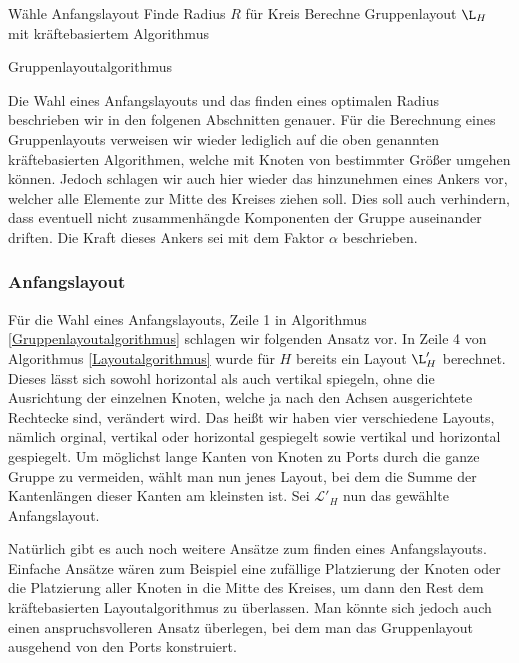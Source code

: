 \begin{algorithm}[H]
\label{Gruppenlayoutalgorithmus}
\SetAlgoLined
{} 
Wähle Anfangslayout\;
Finde Radius $R$ für Kreis\;
Berechne Gruppenlayout  $\L_H$ mit kräftebasiertem Algorithmus\;
\caption{Gruppenlayoutalgorithmus}
\end{algorithm}



Die Wahl eines Anfangslayouts und das finden eines optimalen Radius beschrieben wir  in den folgenen Abschnitten  genauer. 
Für die Berechnung eines Gruppenlayouts verweisen wir wieder lediglich auf die oben genannten kräftebasierten Algorithmen, welche mit Knoten von bestimmter Größer umgehen können. 
Jedoch schlagen wir auch hier wieder das hinzunehmen eines Ankers vor, welcher alle Elemente zur Mitte des Kreises ziehen soll. Dies soll auch verhindern, dass eventuell nicht zusammenhängde Komponenten der Gruppe auseinander driften. Die Kraft dieses Ankers sei mit dem Faktor $\alpha$ beschrieben. 

\subsubsection{Anfangslayout}
Für die Wahl eines Anfangslayouts, Zeile 1 in Algorithmus \ref{Gruppenlayoutalgorithmus} schlagen wir folgenden Ansatz vor.
In Zeile 4 von Algorithmus \ref{Layoutalgorithmus} wurde für $H$ bereits ein Layout $\L'_H$ berechnet. Dieses lässt sich sowohl horizontal als auch vertikal spiegeln, ohne die Ausrichtung der einzelnen Knoten, welche ja nach den Achsen ausgerichtete Rechtecke sind, verändert wird. Das heißt wir haben vier verschiedene Layouts, nämlich orginal, vertikal oder horizontal gespiegelt sowie vertikal und horizontal gespiegelt. Um möglichst lange Kanten von Knoten zu Ports durch die ganze Gruppe zu vermeiden, wählt man nun jenes Layout, bei dem die Summe der Kantenlängen dieser Kanten am kleinsten ist.  Sei $\mathcal{L}'_H$ nun das gewählte Anfangslayout.


Natürlich gibt es auch noch weitere Ansätze zum finden eines Anfangslayouts.
Einfache Ansätze wären zum Beispiel eine zufällige Platzierung der Knoten oder die Platzierung aller Knoten in die Mitte des Kreises, um dann den Rest dem kräftebasierten Layoutalgorithmus zu überlassen. Man könnte sich jedoch auch einen anspruchsvolleren Ansatz überlegen, bei dem man das Gruppenlayout ausgehend von den Ports konstruiert.


